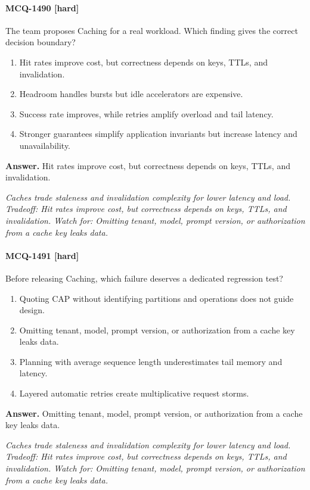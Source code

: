 \paragraph{MCQ-1490 [hard]} The team proposes Caching for a real workload. Which finding gives the correct decision boundary?
\begin{enumerate}[label=\Alph*.]
\item Hit rates improve cost, but correctness depends on keys, TTLs, and invalidation.
\item Headroom handles bursts but idle accelerators are expensive.
\item Success rate improves, while retries amplify overload and tail latency.
\item Stronger guarantees simplify application invariants but increase latency and unavailability.
\end{enumerate}
\noindent\textbf{Answer.} Hit rates improve cost, but correctness depends on keys, TTLs, and invalidation.
\par\textit{Caches trade staleness and invalidation complexity for lower latency and load. Tradeoff: Hit rates improve cost, but correctness depends on keys, TTLs, and invalidation. Watch for: Omitting tenant, model, prompt version, or authorization from a cache key leaks data.}
\paragraph{MCQ-1491 [hard]} Before releasing Caching, which failure deserves a dedicated regression test?
\begin{enumerate}[label=\Alph*.]
\item Quoting CAP without identifying partitions and operations does not guide design.
\item Omitting tenant, model, prompt version, or authorization from a cache key leaks data.
\item Planning with average sequence length underestimates tail memory and latency.
\item Layered automatic retries create multiplicative request storms.
\end{enumerate}
\noindent\textbf{Answer.} Omitting tenant, model, prompt version, or authorization from a cache key leaks data.
\par\textit{Caches trade staleness and invalidation complexity for lower latency and load. Tradeoff: Hit rates improve cost, but correctness depends on keys, TTLs, and invalidation. Watch for: Omitting tenant, model, prompt version, or authorization from a cache key leaks data.}
